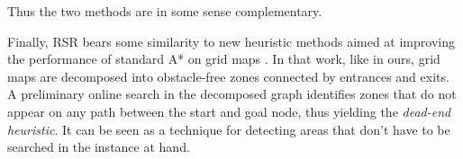 Thus the two methods are in some sense complementary.
\par
Finally, RSR bears some similarity to new heuristic methods aimed at improving the 
performance of standard A* on grid maps \cite{bjornsson06}.
In that work, like in ours, grid maps are decomposed into obstacle-free zones connected by entrances 
and exits.
A preliminary online search in the decomposed graph identifies zones that do not appear 
on any path between the start and goal node, thus yielding the \emph{dead-end heuristic}.
It can be seen as a technique for detecting areas that don't have to be searched
in the instance at hand.

